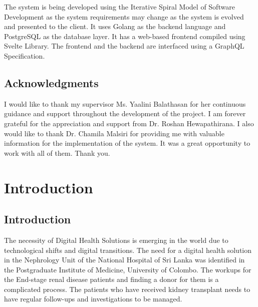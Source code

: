\documentclass[12pt,a4paper]{report}
\renewcommand{\baselinestretch}{1.5}
\begin{document}
The system is being developed using the Iterative Spiral Model of Software Development as the system requirements may change as the system is evolved and presented to the client. It uses Golang as the backend language and PostgreSQL as the database layer. It has a web-based frontend compiled using Svelte Library. The frontend and the backend are interfaced using a GraphQL Specification. 

\newpage

\section*{Acknowledgments}

I would like to thank my supervisor Ms. Yaalini Balathasan for her continuous guidance and support throughout the development of the project. I am forever grateful for the appreciation and support from Dr. Roshan Hewapathirana. I also would like to thank Dr. Chamila Malsiri for providing me with valuable information for the implementation of the system. It was a great opportunity to work with all of them. Thank you. 

\newpage


\newpage 
\renewcommand{\baselinestretch}{1.5}\normalsize
\tableofcontents
{}

\listoffigures
 
\listoftables


\newpage

\setcounter{page}{1}


\chapter{Introduction}
\section{Introduction}
%
%

The necessity of Digital Health Solutions is emerging in the world due to technological shifts and digital transitions. The need for a digital health solution in the Nephrology Unit of the National Hospital of Sri Lanka was identified in the Postgraduate Institute of Medicine, University of Colombo. The workups for the End-stage renal disease patients and finding a donor for them is a complicated process. The patients who have received kidney transplant needs to have regular follow-ups and investigations to be managed. 
\end{document}
